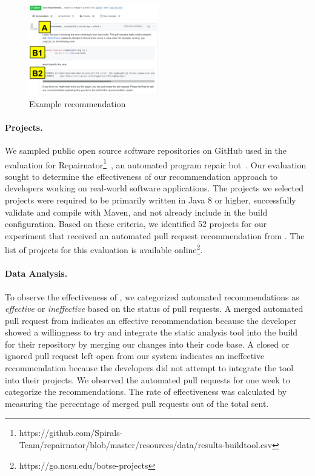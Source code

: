 \begin{figure}
\centering
	\includegraphics[width=0.5\textwidth]{images/pull.png}
	\caption{Example \tele recommendation}	
	\label{fig:tele} 
\end{figure}

\paragraph{Projects.}

We sampled public open source software repositories on GitHub used in the evaluation for Repairnator\footnote{https://github.com/Spirals-Team/repairnator/blob/master/resources/data/results-buildtool.csv}~\cite{Repairnator}, an automated program repair bot~\cite{Repairnator}. Our evaluation sought to determine the effectiveness of our \tele recommendation approach to developers working on real-world software applications. The projects we selected projects were required to be primarily written in Java 8 or higher, successfully validate and compile with Maven, and not already include \EP in the build configuration. Based on these criteria, we identified 52 projects for our experiment that received an automated pull request recommendation from \tool. The list of projects for this evaluation is available online\footnote{https://go.ncsu.edu/botse-projects}.

\paragraph{Data Analysis.}

To observe the effectiveness of \tele, we categorized automated recommendations as \textit{effective} or \textit{ineffective} based on the status of pull requests. A merged automated pull request from \tool indicates an effective recommendation because the developer showed a willingness to try \EP and integrate the static analysis tool  into the build for their repository by merging our changes into their code base. A closed or ignored pull request left open from our system indicates an ineffective recommendation because the developers did not attempt to integrate the tool into their projects. We observed the automated pull requests for one week to categorize the recommendations. The rate of effectiveness was calculated by measuring the percentage of merged pull requests out of the total sent.


